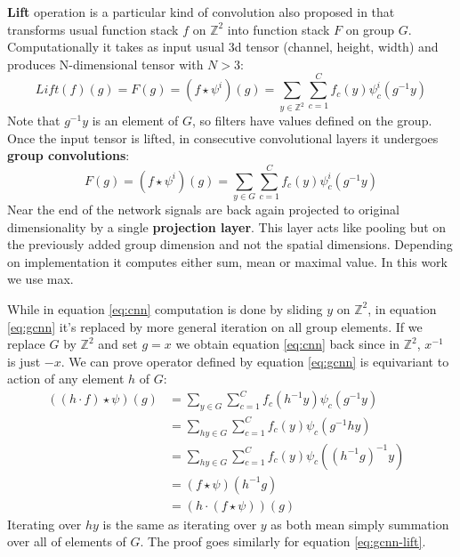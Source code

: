     \textbf{Lift} operation is a particular kind of convolution also proposed in
    \cite{cohen2016}
    that transforms usual function stack $f$ on $\mathbb{Z}^2$ into
    function stack $F$ on group $G$. Computationally it takes as input
    usual 3d tensor (channel, height, width) and produces
    N-dimensional tensor with $N>3$:
    \begin{equation}
        \label{eq:gcnn-lift}
        \mathit{Lift}(f)(g) = F(g) = (f\star\psi^i)(g) = \sum_{y\in \mathbb{Z}^2}\sum_{c=1}^C
        f_c(y)\psi_{c}^{i}(g^{-1}y)
    \end{equation}
    Note that $g^{-1}y$ is an element of $G$, so filters have values defined on
    the group.
    Once the input tensor is lifted, in consecutive convolutional layers it
    undergoes \textbf{group convolutions}:
    \begin{equation}
        \label{eq:gcnn}
        F(g) = (f\star\psi^i)(g) = \sum_{y\in G}\sum_{c=1}^C
        f_c(y)\psi_{c}^{i}(g^{-1}y)
    \end{equation}
    Near the end of the network signals are back again projected to original
    dimensionality by a single \textbf{projection layer}. This layer acts like
    pooling but on the previously added group dimension and not the spatial
    dimensions. Depending on implementation it computes either sum, mean or
    maximal value. In this work we use max.

    While in equation \ref{eq:cnn} computation is done by sliding
    $y$ on $\mathbb{Z}^2$, in equation \ref{eq:gcnn} it's replaced by more
    general iteration on all group elements. If we replace $G$ by $\mathbb{Z}^2$
    and set $g=x$ we obtain equation \ref{eq:cnn} back since in $\mathbb{Z}^2$,
    $x^{-1}$ is just $-x$. We can prove operator defined by equation
    \ref{eq:gcnn} is equivariant to action of any element $h$ of $G$:
    \begin{align*}
        ((h\cdot f)\star\psi)(g) & =
        \sum_{y\in G}\sum_{c=1}^C f_c(h^{-1}y)\psi_{c}(g^{-1}y)\\
        & = \sum_{hy\in G}\sum_{c=1}^C f_c(y)\psi_{c}(g^{-1}hy)\\
        & = \sum_{hy\in G}\sum_{c=1}^C f_c(y)\psi_{c}((h^{-1}g)^{-1}y)\\
        & = (f\star\psi)(h^{-1}g) &  \\
        & = (h\cdot(f\star\psi))(g)
    \end{align*}
    Iterating over $hy$ is the same as iterating over $y$ as both mean simply
    summation over all of elements of $G$.
    The proof goes similarly for equation \ref{eq:gcnn-lift}.

